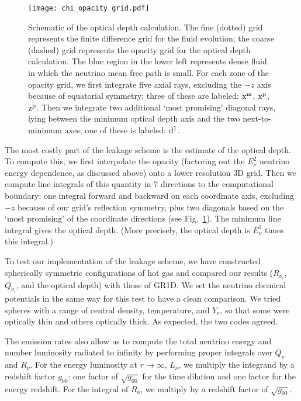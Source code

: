 \begin{figure}
\texttt{[image: chi\_opacity\_grid.pdf]}
\caption{
Schematic of the optical depth calculation. The fine (dotted) grid
represents the finite difference grid for the fluid evolution; the coarse
(dashed) grid represents the opacity grid for the optical depth calculation.
The blue region in the lower left represents dense fluid in which the neutrino
mean free path is small. For each zone of the opacity grid, we first integrate
five axial rays, excluding the $-z$
axis because of equatorial symmetry; three of these are labeled:
$\rm x^m$, $\rm x^p$, $\rm z^p$.
Then we integrate two additional `most promising' diagonal rays,
lying between the minimum optical depth axis and the two next-to-minimum axes;
one of these is labeled: $\rm d^1$.
}
\label{fig:chi_opacity_grid}
\end{figure}

The most costly part of the leakage scheme is the estimate of the
optical depth.  To compute this, we first interpolate the opacity
(factoring out the $E_{\nu}^2$ neutrino energy dependence, as discussed
above) onto a lower resolution 3D grid.  Then we compute
line integrals of this quantity in 7 directions to the computational boundary:
one integral forward and backward on each coordinate axis, excluding $-z$ because of our
grid's reflection symmetry, plus two diagonals based on the `most
promising' of the coordinate directions (see Fig.~\ref{fig:chi_opacity_grid}).
The minimum line integral gives the optical depth.
(More precisely, the optical depth is $E_{\nu}^2$ times this integral.)

To test our implementation of the leakage scheme, we have constructed
spherically symmetric configurations of hot gas and compared our
results ($R_{\nu_i}$, $Q_{\nu_i}$, and the optical depth) with those
of GR1D.  We set the neutrino chemical potentials in the same way for
this test to have a clean comparison.  We tried spheres with a range of
central density, temperature,
and $Y_e$, so that some were optically thin and others optically thick. 
As expected, the two codes agreed.

The emission rates also allow us to compute the total neutrino energy
and number luminosity radiated to infinity by performing proper integrals
over $Q_{\nu}$ and $R_{\nu}$.  For the energy luminosity at $r\rightarrow\infty$, $L_{\nu}$,
we multiply the integrand by a redshift factor $g_{00}$:  one factor of
$\sqrt{g_{00}}$ for the time dilation and one factor for the energy redshift. 
For the integral of $R_{\nu}$, we multiply by a redshift factor of
$\sqrt{g_{00}}$.

